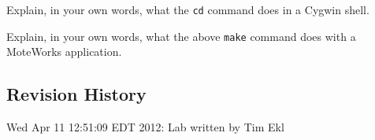 \documentclass{article}
\begin{document}
\begin{itemize*}
\item {} Explain, in your own words, what the \verb!cd! command does in a Cygwin shell.
\item {} Explain, in your own words, what the above \verb!make! command does with a MoteWorks application.
\end{itemize*}



\subsection*{Revision History}
\begin{itemize*}
 \item Wed Apr 11 12:51:09 EDT 2012: Lab written by Tim Ekl
\end{itemize*}
\end{document}
